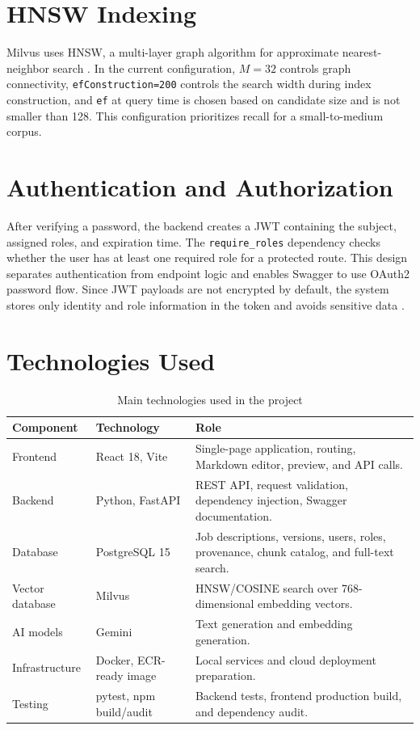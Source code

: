\documentclass[12pt,a4paper,oneside]{report}
\newcommand{\code}[1]{\texttt{#1}}
\begin{document}
\section{HNSW Indexing}
Milvus uses HNSW, a multi-layer graph algorithm for approximate nearest-neighbor search \cite{malkov2018hnsw}. In the current configuration, $M=32$ controls graph connectivity, \code{efConstruction=200} controls the search width during index construction, and \code{ef} at query time is chosen based on candidate size and is not smaller than 128. This configuration prioritizes recall for a small-to-medium corpus.

\section{Authentication and Authorization}
After verifying a password, the backend creates a JWT containing the subject, assigned roles, and expiration time. The \code{require\_roles} dependency checks whether the user has at least one required role for a protected route. This design separates authentication from endpoint logic and enables Swagger to use OAuth2 password flow. Since JWT payloads are not encrypted by default, the system stores only identity and role information in the token and avoids sensitive data \cite{rfc7519}.

\section{Technologies Used}
\begin{table}[H]
\centering
\caption{Main technologies used in the project}
\label{tab:technology}
\begin{tabularx}{\textwidth}{p{3.2cm}p{3cm}X}
\toprule
\textbf{Component} & \textbf{Technology} & \textbf{Role}\\
\midrule
Frontend & React 18, Vite & Single-page application, routing, Markdown editor, preview, and API calls.\\
Backend & Python, FastAPI & REST API, request validation, dependency injection, Swagger documentation.\\
Database & PostgreSQL 15 & Job descriptions, versions, users, roles, provenance, chunk catalog, and full-text search.\\
Vector database & Milvus & HNSW/COSINE search over 768-dimensional embedding vectors.\\
AI models & Gemini & Text generation and embedding generation.\\
Infrastructure & Docker, ECR-ready image & Local services and cloud deployment preparation.\\
Testing & pytest, npm build/audit & Backend tests, frontend production build, and dependency audit.\\
\bottomrule
\end{tabularx}
\end{table}
\end{document}
